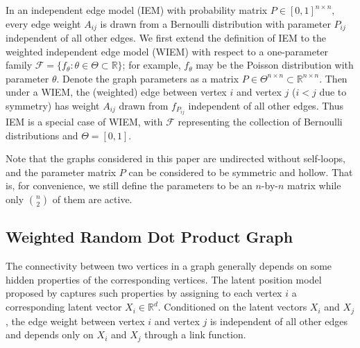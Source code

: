\documentclass[a4paper]{article}
\begin{document}
In an independent edge model (IEM) \citep{bollobas2007phase} with probability matrix $P \in [0, 1]^{n \times n}$, every edge weight $A_{ij}$ is drawn from a Bernoulli distribution with parameter $P_{ij}$ independent of all other edges.
We first extend the definition of IEM to the weighted independent edge model (WIEM) with respect to a one-parameter family $\mathcal{F} = \{ f_{\theta} : \theta \in \Theta \subset \mathbb{R} \}$; for example, $f_{\theta}$ may be the Poisson distribution with parameter $\theta$. Denote the graph parameters as a matrix $P \in \Theta^{n \times n} \subset \mathbb{R}^{n \times n}$. Then under a WIEM, the (weighted) edge between vertex $i$ and vertex $j$ ($i < j$ due to symmetry) has weight $A_{ij}$ drawn from $f_{P_{ij}}$ independent of all other edges.
Thus IEM is a special case of WIEM, with $\mathcal{F}$ representing the collection of Bernoulli distributions and $\Theta = [0, 1]$.

Note that the graphs considered in this paper are undirected without self-loops, and the parameter matrix $P$ can be considered to be symmetric and hollow. That is, for convenience, we still define the parameters to be an $n$-by-$n$ matrix while only $n \choose 2$ of them are active.



\subsection{Weighted Random Dot Product Graph}
\label{section:WRDPG}

The connectivity between two vertices in a graph generally depends on some hidden properties of the corresponding vertices. The latent position model proposed by \citet{hoff2002latent} captures such properties by assigning to each vertex $i$ a corresponding latent vector $X_i \in \mathbb{R}^d$. Conditioned on the latent vectors $X_i$ and $X_j$, the edge weight between vertex $i$ and vertex $j$ is independent of all other edges and depends only on $X_i$ and $X_j$ through a link function.
\end{document}
